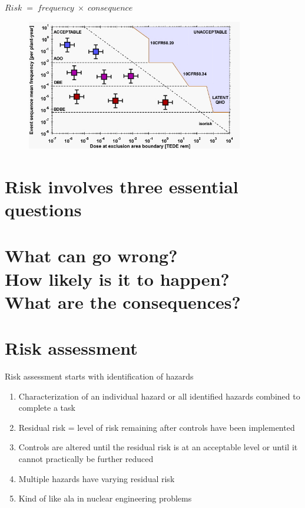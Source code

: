 \documentclass[aspectratio=1610,pdftex,dvipsnames,compress,xcolor={dvipsnames}]{beamer}
\newcommand{\acs}{\acrshort} %
\begin{document}
\begin{frame}{$Risk \; = \; frequency \; \times \; consequence$}
    \begin{figure}
        \centering
        \includegraphics[width=0.85\textwidth]{farmer.jpg}
    \end{figure}
\end{frame}


\section{Risk involves three essential questions}


\section{
    What can go wrong?\\
    How likely is it to happen?\\
    What are the consequences?
}


\section{Risk assessment}


\addtocounter{framenumber}{-3}
\begin{frame}{Risk assessment starts with identification of hazards}
    \begin{enumerate}[series=outerlist,topsep=0pt,itemsep=18pt,leftmargin=*,label=(\arabic*)]
        \item[]Characterization of an individual hazard or all identified hazards combined to complete a task
        \item[]Residual risk = level of risk remaining after controls have been implemented
        \item[]Controls are altered until the residual risk is at an acceptable level or until it cannot practically be further reduced
        \item[]Multiple hazards have varying residual risk
        \item[]Kind of like \acs{ala} in nuclear engineering problems
    \end{enumerate}
\end{frame}
\end{document}
